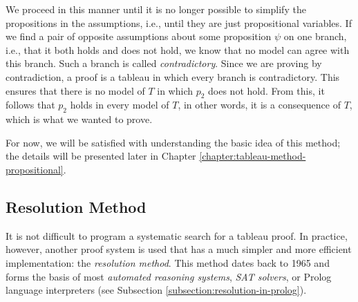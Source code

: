 We proceed in this manner until it is no longer possible to simplify the propositions in the assumptions, i.e., until they are just propositional variables. If we find a pair of opposite assumptions about some proposition \( \psi \) on one branch, i.e., that it both holds and does not hold, we know that no model can agree with this branch. Such a branch is called \emph{contradictory}. Since we are proving by contradiction, a proof is a tableau in which every branch is contradictory. This ensures that there is no model of \( T \) in which \( p_2 \) does not hold. From this, it follows that \( p_2 \) holds in every model of \( T \), in other words, it is a consequence of \( T \), which is what we wanted to prove.

For now, we will be satisfied with understanding the basic idea of this method; the details will be presented later in Chapter \ref{chapter:tableau-method-propositional}.


\subsection{Resolution Method}

It is not difficult to program a systematic search for a tableau proof. In practice, however, another proof system is used that has a much simpler and more efficient implementation: the \emph{resolution method}. This method dates back to 1965 and forms the basis of most \emph{automated reasoning systems}, \emph{SAT solvers}, or Prolog language interpreters (see Subsection \ref{subsection:resolution-in-prolog}).

